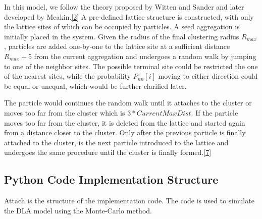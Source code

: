 \documentclass[10pt]{article}
\begin{document}
In this model, we follow the theory proposed by Witten and Sander and later developed by Meakin.\hyperref[ref2]{[2]} A pre-defined lattice structure is constructed, with only the lattice sites of which can be occupied by particles. A seed aggregation is initially placed in the system. Given the radius of the final clustering radius $R_{max}$, particles are added one-by-one to the lattice site at a sufficient distance $R_{max}+5$ from the current aggregation and undergoes a random walk by jumping to one of the neighbor sites. The possible terminal site could be restricted the one of the nearest sites, while the probability $P_{nn}[i]$ moving to either direction could be equal or unequal, which would be further clarified later.

The particle would continues the random walk until it attaches to the cluster or moves too far from the cluster which is $3*CurrentMaxDist$. If the particle moves too far from the cluster, it is deleted from the lattice and started again from a distance closer to the cluster. Only after the previous particle is finally attached to the cluster, is the next particle introduced to the lattice and undergoes the same procedure until the cluster is finally formed.\hyperref[ref7]{[7]}

\newpage

\subsection{Python Code Implementation Structure}

Attach is the structure of the implementation code. The code is used to simulate the DLA model using the Monte-Carlo method.
\end{document}
